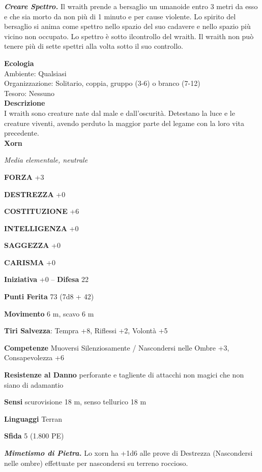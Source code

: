 \begin{multicols}{2}
\emph{\textbf{Creare Spettro.}} Il wraith prende a bersaglio un umanoide entro 3 metri da esso e che sia morto da non più di 1 minuto e per cause violente. Lo spirito del bersaglio si anima come spettro nello spazio del suo cadavere e nello spazio più vicino non occupato. Lo spettro è sotto ilcontrollo del wraith. Il wraith non può tenere più di sette  spettri alla volta sotto il suo controllo.

\textbf{Ecologia}\\
Ambiente: Qualsiasi\\
Organizzazione: Solitario, coppia, gruppo (3-6) o branco (7-12)\\
Tesoro: Nessuno\\
\textbf{Descrizione}\\
I wraith sono creature nate dal male e dall'oscurità. Detestano la luce e le creature viventi, avendo perduto la maggior parte del legame con la loro vita precedente.\\


\medskip{}\textbf{Xorn}

\emph{Media elementale, neutrale}

\textbf{FORZA} +3

\textbf{DESTREZZA} +0

\textbf{COSTITUZIONE} +6

\textbf{INTELLIGENZA} +0

\textbf{SAGGEZZA} +0

\textbf{CARISMA} +0

\textbf{Iniziativa} +0 -- \textbf{Difesa} 22

\textbf{Punti Ferita} 73 (7d8 + 42)

\textbf{Movimento} 6 m, scavo 6 m

\textbf{Tiri Salvezza}: Tempra +8, Riflessi +2, Volontà +5

\textbf{Competenze} Muoversi Silenziosamente / Nascondersi nelle Ombre +3, Consapevolezza +6

\textbf{Resistenze al Danno} perforante e tagliente di attacchi non magici che non siano di adamantio

\textbf{Sensi} scurovisione 18 m, senso tellurico 18 m

\textbf{Linguaggi} Terran

\textbf{Sfida} 5 (1.800 PE)

\emph{\textbf{Mimetismo di Pietra.}} Lo xorn ha +1d6 alle prove di Destrezza (Nascondersi nelle ombre) effettuate per nascondersi su terreno roccioso.


\end{multicols}
